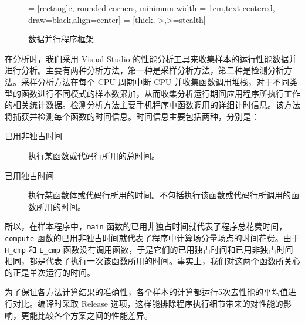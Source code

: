 \begin{figure}
	\centering
	 = [rectangle, rounded corners, minimum width = 1cm,text centered, draw=black,align=center]
	 = [thick,->,>=stealth]
	\caption{数据并行程序框架}
	\label{ch3 workflow:calltree}
\end{figure}

在分析时，我们采用 Visual Studio 的性能分析工具来收集样本的运行性能数据并进行分析。主要有两种分析方法，第一种是采样分析方法，第二种是检测分析方法。采样分析方法在每个 CPU 周期中断 CPU 并收集函数调用堆栈，对于不同类型的函数进行不同模式的样本数累加，从而收集分析运行期间应用程序所执行工作的相关统计数据。检测分析方法主要手机程序中函数调用的详细计时信息。该方法将捕获并检测每个函数的时间信息。时间信息主要包括两种，分别是：
\begin{description}
	\item[已用非独占时间]\quad 执行某函数或代码行所用的总时间。
	\item[已用独占时间]\quad 执行某函数体或代码行所用的时间。不包括执行该函数或代码行所调用的函数所用的时间。
\end{description}
所以，在样本程序中，\lstinline|main| 函数的已用非独占时间就代表了程序总花费时间，\lstinline|compute| 函数的已用非独占时间就代表了程序中计算场分量场点的时间花费。由于 \lstinline|H_cmp| 和 \lstinline|E_cmp| 函数没有调用函数，于是它们的已用独占时间和已用非独占时间相同，都是代表了执行一次该函数所用的时间。事实上，我们对这两个函数所关心的正是单次运行的时间。

为了保证各方法计算结果的准确性，各个样本的计算都运行5次去性能的平均值进行对比。编译时采取 Release 选项，这样能排除程序执行细节带来的对性能的影响，更能比较各个方案之间的性能差异。

